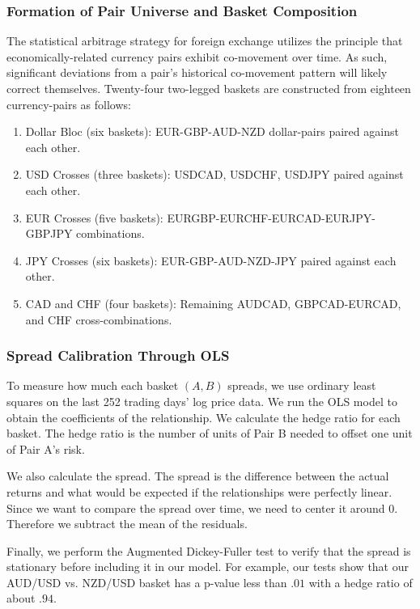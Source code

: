 \documentclass[12pt]{article}
\begin{document}
\subsubsection{Formation of Pair Universe and Basket Composition}

The statistical arbitrage strategy for foreign exchange utilizes the principle that economically-related currency pairs exhibit co-movement over time. As such, significant deviations from a pair's historical co-movement pattern will likely correct themselves. Twenty-four two-legged baskets are constructed from eighteen currency-pairs as follows:

\begin{enumerate}
    \item Dollar Bloc (six baskets): EUR-GBP-AUD-NZD dollar-pairs paired against each other.
    \item USD Crosses (three baskets): USDCAD, USDCHF, USDJPY paired against each other.
    \item EUR Crosses (five baskets): EURGBP-EURCHF-EURCAD-EURJPY-GBPJPY combinations.
    \item JPY Crosses (six baskets): EUR-GBP-AUD-NZD-JPY paired against each other.
    \item CAD and CHF (four baskets): Remaining AUDCAD, GBPCAD-EURCAD, and CHF cross-combinations.
\end{enumerate}

\subsubsection{Spread Calibration Through OLS}

To measure how much each basket $(A,B)$ spreads, we use ordinary least squares on the last 252 trading days' log price data. We run the OLS model to obtain the coefficients of the relationship. We calculate the hedge ratio for each basket. The hedge ratio is the number of units of Pair B needed to offset one unit of Pair A's risk.

We also calculate the spread. The spread is the difference between the actual returns and what would be expected if the relationships were perfectly linear. Since we want to compare the spread over time, we need to center it around 0. Therefore we subtract the mean of the residuals.

Finally, we perform the Augmented Dickey-Fuller test to verify that the spread is stationary before including it in our model. For example, our tests show that our AUD/USD vs. NZD/USD basket has a p-value less than $.01$ with a hedge ratio of about $.94$.
\end{document}

